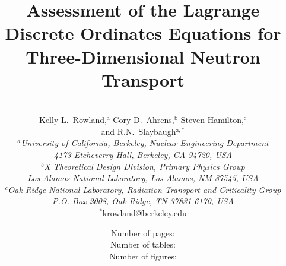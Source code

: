 \documentclass{article} %
\begin{document}

\title{Assessment of the Lagrange Discrete Ordinates Equations for
Three-Dimensional Neutron Transport} %

\author{
\vspace{20mm}
\\Kelly L.\ Rowland,$^{\text{a}}$  Cory D.\ Ahrens,$^\text{b}$ Steven Hamilton,$^\text{c}$ 
\\and R.N.\ Slaybaugh$^{\text{a},\ast}$\\[4pt] 
\textit{$^a$University of California, Berkeley, Nuclear Engineering Department}\\[-10pt]
\textit{4173 Etcheverry Hall, Berkeley, CA 94720, USA} \\[-5pt]
\textit{$^b$X Theoretical Design Division, Primary Physics Group}\\[-10pt]
\textit{Los Alamos National Laboratory, Los Alamos, NM 87545, USA}\\[-5pt]
\textit{$^c$Oak Ridge National Laboratory, Radiation Transport and Criticality Group} \\ [-10pt]
\textit{P.O. Box 2008, Oak Ridge, TN 37831-6170, USA} \\ [-2pt]
{$^\ast$krowland@berkeley.edu}} %

\date{
\vspace{40mm}
Number of pages: \pageref{LastPage} \\  
Number of tables: \totaltables \\
Number of figures: \totalfigures \\}                                              

\maketitle

\pagebreak
\end{document}
